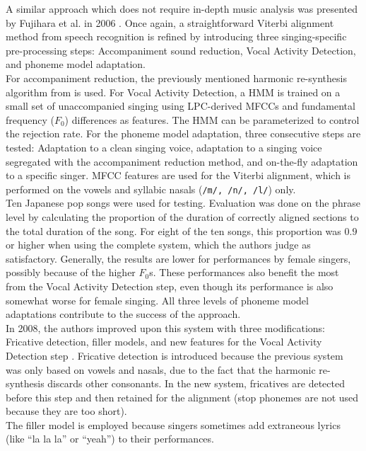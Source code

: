 A similar approach which does not require in-depth music analysis was presented by Fujihara et al. in 2006 \cite{fujihara_alignment}. Once again, a straightforward Viterbi alignment method from speech recognition is refined by introducing three singing-specific pre-processing steps: Accompaniment sound reduction, Vocal Activity Detection, and phoneme model adaptation.\\
For accompaniment reduction, the previously mentioned harmonic re-synthesis algorithm from \cite{fujihara_identification} is used. For Vocal Activity Detection, a HMM is trained on a small set of unaccompanied singing using LPC-derived MFCCs and fundamental frequency ($F_0$) differences as features. The HMM can be parameterized to control the rejection rate. For the phoneme model adaptation, three consecutive steps are tested: Adaptation to a clean singing voice, adaptation to a singing voice segregated with the accompaniment reduction method, and on-the-fly adaptation to a specific singer. MFCC features are used for the Viterbi alignment, which is performed on the vowels and syllabic nasals (\texttt{/m/, /n/, /l/}) only.\\
Ten Japanese pop songs were used for testing. Evaluation was done on the phrase level by calculating the proportion of the duration of correctly aligned sections to the total duration of the song. For eight of the ten songs, this proportion was $0.9$ or higher when using the complete system, which the authors judge as satisfactory. Generally, the results are lower for performances by female singers, possibly because of the higher $F_0$s. These performances also benefit the most from the Vocal Activity Detection step, even though its performance is also somewhat worse for female singing. All three levels of phoneme model adaptations contribute to the success of the approach.\\
In 2008, the authors improved upon this system with three modifications: Fricative detection, filler models, and new features for the Vocal Activity Detection step \cite{fujihara}. Fricative detection is introduced because the previous system was only based on vowels and nasals, due to the fact that the harmonic re-synthesis discards other consonants. In the new system, fricatives are detected before this step and then retained for the alignment (stop phonemes are not used because they are too short).\\
The filler model is employed because singers sometimes add extraneous lyrics (like ``la la la'' or ``yeah'') to their performances.\\
